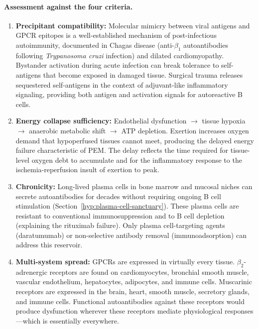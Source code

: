 \paragraph{Assessment against the four criteria.}

\begin{enumerate}
    \item \textbf{Precipitant compatibility:} Molecular mimicry between viral antigens and GPCR epitopes is a well-established mechanism of post-infectious autoimmunity, documented in Chagas disease (anti-$\beta_1$ autoantibodies following \emph{Trypanosoma cruzi} infection) and dilated cardiomyopathy. Bystander activation during acute infection can break tolerance to self-antigens that become exposed in damaged tissue. Surgical trauma releases sequestered self-antigens in the context of adjuvant-like inflammatory signaling, providing both antigen and activation signals for autoreactive B cells.

    \item \textbf{Energy collapse sufficiency:} Endothelial dysfunction $\rightarrow$ tissue hypoxia $\rightarrow$ anaerobic metabolic shift $\rightarrow$ ATP depletion. Exertion increases oxygen demand that hypoperfused tissues cannot meet, producing the delayed energy failure characteristic of PEM. The delay reflects the time required for tissue-level oxygen debt to accumulate and for the inflammatory response to the ischemia-reperfusion insult of exertion to peak.

    \item \textbf{Chronicity:} Long-lived plasma cells in bone marrow and mucosal niches can secrete autoantibodies for decades without requiring ongoing B cell stimulation (Section~\ref{hyp:plasma-cell-sanctuary}). These plasma cells are resistant to conventional immunosuppression and to B cell depletion (explaining the rituximab failure). Only plasma cell-targeting agents (daratumumab) or non-selective antibody removal (immunoadsorption) can address this reservoir.

    \item \textbf{Multi-system spread:} GPCRs are expressed in virtually every tissue. $\beta_2$-adrenergic receptors are found on cardiomyocytes, bronchial smooth muscle, vascular endothelium, hepatocytes, adipocytes, and immune cells. Muscarinic receptors are expressed in the brain, heart, smooth muscle, secretory glands, and immune cells. Functional autoantibodies against these receptors would produce dysfunction wherever these receptors mediate physiological responses---which is essentially everywhere.
\end{enumerate}

